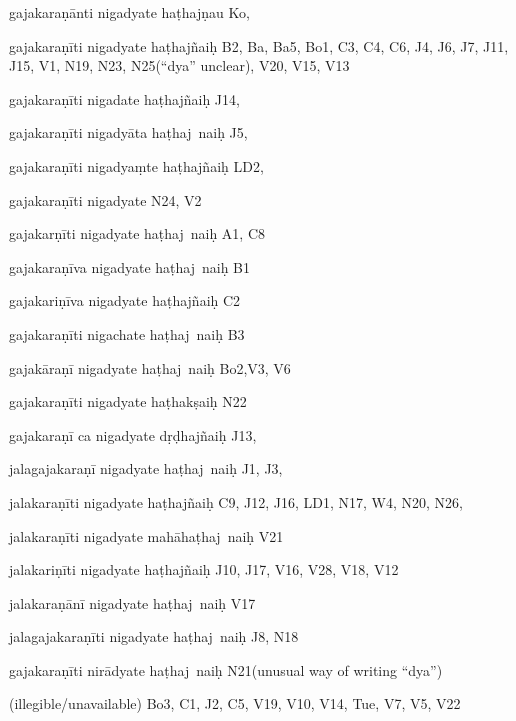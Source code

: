 \begin{ekdosis}
\begin{marma}[hp01_055]
\begin{marma}[hp02_009]
\begin{marma}[hp02_011]
\begin{marma}[hp02_26d]
\item[gajakaraṇānti nigadyate haṭhajṇau] Ko,
\item[gajakaraṇīti nigadyate haṭhajñaiḥ] B2, Ba, Ba5, Bo1, C3, C4, C6, J4, J6, J7, J11, J15, V1, N19, N23, N25(“dya” unclear), V20, V15, V13
\item[gajakaraṇīti nigadate haṭhajñaiḥ] J14,
\item[gajakaraṇīti nigadyāta haṭhaj~naiḥ] J5,
\item[gajakaraṇīti nigadyaṃte haṭhajñaiḥ] LD2,
\item[gajakaraṇīti nigadyate] N24, V2
\item[gajakarṇīti nigadyate haṭhaj~naiḥ] A1, C8
\item[gajakaraṇīva nigadyate haṭhaj~naiḥ] B1
\item[gajakariṇīva nigadyate haṭhajñaiḥ] C2
\item[gajakaraṇīti nigachate haṭhaj~naiḥ] B3
\item[gajakāraṇī nigadyate haṭhaj~naiḥ] Bo2,V3, V6
\item[gajakaraṇīti nigadyate haṭhakṣaiḥ] N22
\item[gajakaraṇī ca nigadyate dṛḍhajñaiḥ] J13,
\item[jalagajakaraṇī nigadyate haṭhaj~naiḥ] J1, J3, 
\item[jalakaraṇīti nigadyate haṭhajñaiḥ] C9, J12, J16, LD1, N17, W4, N20, N26, 
\item[jalakaraṇīti nigadyate mahāhaṭhaj~naiḥ] V21
\item[jalakariṇīti nigadyate haṭhajñaiḥ] J10, J17, V16, V28, V18, V12
\item[jalakaraṇānī nigadyate haṭhaj~naiḥ] V17
\item[jalagajakaraṇīti nigadyate haṭhaj~naiḥ] J8, N18
\item[gajakaraṇīti nirādyate haṭhaj~naiḥ] N21(unusual way of writing “dya”)
\item[(illegible/unavailable)] Bo3, C1, J2, C5, V19, V10, V14, Tue, V7, V5, V22
 \begin{description}
        \end{description}
\end{marma}


\end{marma}
\end{marma}
\end{marma}
\end{ekdosis}
